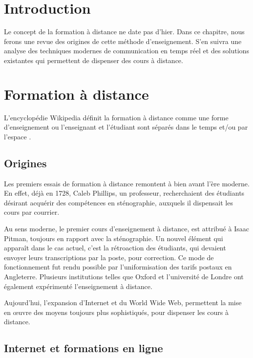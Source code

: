 \section*{Introduction}

Le concept de la formation à distance ne date pas d’hier. 
Dans ce chapitre, nous ferons une revue des origines de cette méthode d’enseignement. 
S’en suivra une analyse des techniques modernes de communication en temps réel et des solutions existantes qui permettent  de dispenser des cours à distance.

\section{Formation à distance}

L'encyclopédie Wikipedia définit la formation à distance comme une 
forme d’enseignement ou l’enseignant et l'étudiant sont séparés 
dans le temps et/ou par l’espace \cite{distance_education}.

\subsection{Origines}

Les premiers essais de formation à distance remontent à bien avant l'ère moderne. 
En effet, déjà en 1728, Caleb Phillips, un professeur, 
recherchaient des étudiants désirant acquérir des compétences en sténographie, 
auxquels il dispensait les cours par courrier.

Au sens moderne, le premier cours d’enseignement à distance, est attribué à Isaac Pitman, toujours en rapport avec la sténographie. 
Un nouvel élément qui apparaît dans le cas actuel, c’est la rétroaction des étudiants, 
qui devaient envoyer leurs transcriptions par la poste, pour correction. 
Ce mode de fonctionnement fut rendu possible par l’uniformisation des tarifs postaux en Angleterre. 
Plusieurs institutions telles que Oxford et l'université de Londre ont également expérimenté l’enseignement à distance.

Aujourd’hui, l’expansion d’Internet et du World Wide Web, permettent la mise en œuvre des moyens toujours plus sophistiqués, pour dispenser les cours à distance.


\subsection{Internet et formations en ligne}

